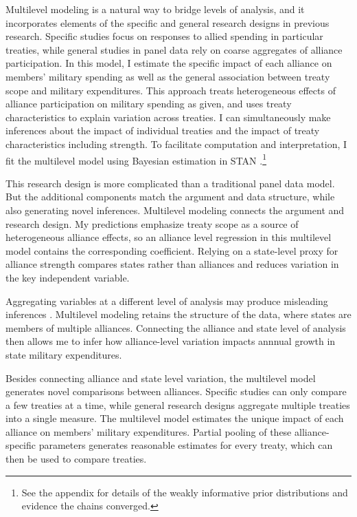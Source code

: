 \documentclass[12pt]{article}
\begin{document}
Multilevel modeling is a natural way to bridge levels of analysis, and it incorporates elements of the specific and general research designs in previous research. 
Specific studies focus on responses to allied spending in particular treaties, while general studies in panel data rely on coarse aggregates of alliance participation.
In this model, I estimate the specific impact of each alliance on members' military spending as well as the general association between treaty scope and military expenditures. 
This approach treats heterogeneous effects of alliance participation on military spending as given, and uses treaty characteristics to explain variation across treaties. 
I can simultaneously make inferences about the impact of individual treaties and the impact of treaty characteristics including strength. 
To facilitate computation and interpretation, I fit the multilevel model using Bayesian estimation in STAN \citep{Carpenteretal2016}.\footnote{See the appendix for details of the weakly informative prior distributions and evidence the chains converged.}


This research design is more complicated than a traditional panel data model. 
But the additional components match the argument and data structure, while also generating novel inferences. 
Multilevel modeling connects the argument and research design. 
My predictions emphasize treaty scope as a source of heterogeneous alliance effects, so an alliance level regression in this multilevel model contains the corresponding coefficient.
Relying on a state-level proxy for alliance strength compares states rather than alliances and reduces variation in the key independent variable.


Aggregating variables at a different level of analysis may produce misleading inferences \citep{McElreath2016}. 
Multilevel modeling retains the structure of the data, where states are members of multiple alliances. 
Connecting the alliance and state level of analysis then allows me to infer how alliance-level variation impacts annnual growth in state military expenditures. 


Besides connecting alliance and state level variation, the multilevel model generates novel comparisons between alliances. 
Specific studies can only compare a few treaties at a time, while general research designs aggregate multiple treaties into a single measure. 
The multilevel model estimates the unique impact of each alliance on members' military expenditures. 
Partial pooling of these alliance-specific parameters generates reasonable estimates for every treaty, which can then be used to compare treaties. 
\end{document}
